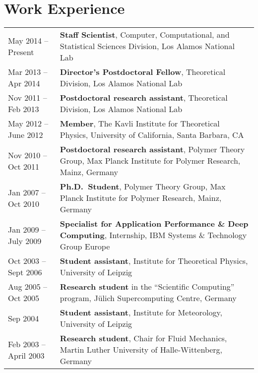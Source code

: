\documentclass{article}
\begin{document}
\section*{Work Experience}
\begin{tabular}{p{}p{}}
May 2014 -- Present & \textbf{Staff Scientist}, Computer, Computational, and Statistical Sciences Division, Los Alamos National Lab\\
Mar 2013 -- Apr 2014 & \textbf{Director's Postdoctoral Fellow}, Theoretical Division, Los Alamos National Lab\\
Nov 2011 -- Feb 2013 & \textbf{Postdoctoral research assistant}, Theoretical Division, Los Alamos National Lab\\
May 2012 -- June 2012 & \textbf{Member}, The Kavli Institute for Theoretical Physics, University of California, Santa Barbara, CA \\
Nov 2010 -- Oct 2011 & \textbf{Postdoctoral research assistant}, Polymer Theory Group, Max Planck Institute for Polymer Research, Mainz, Germany\\
Jan 2007 -- Oct 2010 & \textbf{Ph.D.\ Student}, Polymer Theory Group, Max Planck Institute for Polymer Research, Mainz, Germany\\
Jan 2009 -- July 2009 & \textbf{Specialist for Application Performance \& Deep Computing}, Internship, IBM Systems \& Technology Group Europe \\
Oct 2003 -- Sept 2006 & \textbf{Student assistant}, Institute for Theoretical Physics, University of Leipzig \\
Aug 2005 -- Oct 2005 & \textbf{Research student} in the ``Scientific Computing'' program, J{\"u}lich Supercomputing Centre, Germany \\
Sep 2004 & \textbf{Student assistant}, Institute for Meteorology, University of Leipzig \\
Feb 2003 -- April 2003 & \textbf{Research student}, Chair for Fluid Mechanics, Martin Luther University of Halle-Wittenberg, Germany \\
\end{tabular}

\vspace{-2mm}
\end{document}
